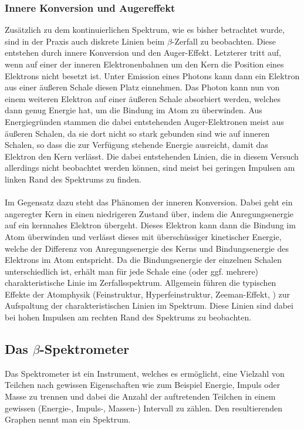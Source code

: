 \documentclass[11pt, a4paper]{article}
\numberwithin{equation}{section}
\begin{document}
\subsubsection{Innere Konversion und Augereffekt}
Zusätzlich zu dem kontinuierlichen Spektrum, wie es bisher betrachtet wurde, sind in der Praxis auch diskrete Linien beim $\beta$-Zerfall zu beobachten.
Diese entstehen durch innere Konversion und den Auger-Effekt.
Letzterer tritt auf, wenn auf einer der inneren Elektronenbahnen um den Kern die Position eines Elektrons nicht besetzt ist.
Unter Emission eines Photons kann dann ein Elektron aus einer äußeren Schale diesen Platz einnehmen. Das Photon kann nun von einem weiteren Elektron auf einer äußeren Schale absorbiert werden, welches dann genug Energie hat, um die Bindung im Atom zu überwinden.
Aus Energiegründen stammen die dabei entstehenden Auger-Elektronen meist aus äußeren Schalen, da sie dort nicht so stark gebunden sind wie auf inneren Schalen, so dass die zur Verfügung stehende Energie ausreicht, damit das Elektron den Kern verlässt.
Die dabei entstehenden Linien, die in diesem Versuch allerdings nicht beobachtet werden können, sind meist bei geringen Impulsen am linken Rand des Spektrums zu finden.\\
\\
Im Gegensatz dazu steht das Phänomen der inneren Konversion.
Dabei geht ein angeregter Kern in einen niedrigeren Zustand über, indem die Anregungsenergie auf ein kernnahes Elektron übergeht.
Dieses Elektron kann dann die Bindung im Atom überwinden und verlässt dieses mit überschüssiger kinetischer Energie, welche der Differenz von Anregungsenergie des Kerns und Bindungsenergie des Elektrons im Atom entspricht.
Da die Bindungsenergie der einzelnen Schalen unterschiedlich ist, erhält man für jede Schale eine (oder ggf. mehrere) charakteristische Linie im Zerfallsspektrum.
Allgemein führen die typischen Effekte der Atomphysik (Feinstruktur, Hyperfeinstruktur, Zeeman-Effekt, \textellipsis) zur Aufspaltung der charakteristischen Linien im Spektrum.
Diese Linien sind dabei bei hohen Impulsen am rechten Rand des Spektrums zu beobachten.

\subsection{Das $\beta$-Spektrometer}
Das Spektrometer ist ein Instrument, welches es ermöglicht, eine Vielzahl von Teilchen nach gewissen Eigenschaften wie zum Beispiel Energie, Impuls oder Masse zu trennen und dabei die Anzahl der auftretenden Teilchen in einem gewissen (Energie-, Impuls-, Massen-) Intervall zu zählen.
Den resultierenden Graphen nennt man ein Spektrum.
\end{document}
